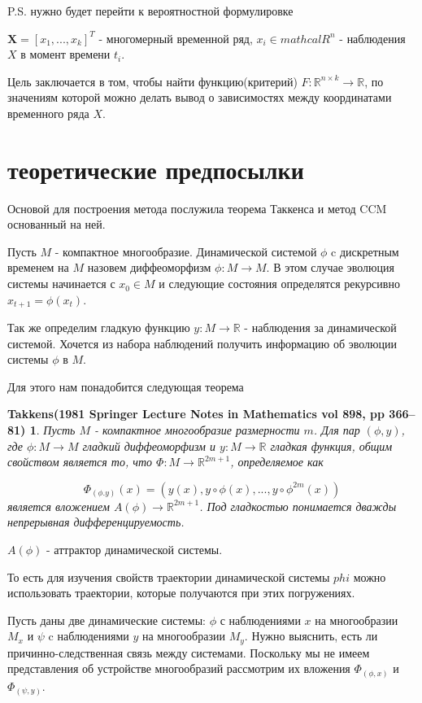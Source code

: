 \documentclass[12pt, twoside]{article}
\newtheorem{theorem}{Takkens(1981 Springer Lecture Notes in Mathematics vol 898, pp 366–81)}
\begin{document}
P.S. нужно будет перейти к вероятностной формулировке

$\mathbf{X} = [x_1, ... , x_k]^T$ - многомерный временной ряд, $x_i \in mathcal{R}^n$ - наблюдения $X$ в момент времени $t_i$.

Цель заключается в том, чтобы найти функцию(критерий) $F: \mathbb{R}^{n \times k } \rightarrow \mathbb R$, по значениям которой можно делать вывод о зависимостях между координатами временного ряда $X$.


\section{теоретические предпосылки}

Основой для построения метода послужила теорема Таккенса и метод CCM основанный на ней.

Пусть $M$ - компактное многообразие. Динамической системой $\phi$ c дискретным временем на $M$ назовем диффеоморфизм $\phi: M\rightarrow M$. В этом случае эволюция системы начинается с $x_0 \in M$ и следующие состояния определятся рекурсивно $x_{t+ 1} = \phi(x_t)$. 

Так же определим гладкую функцию $y: M \rightarrow \mathbb R$ - наблюдения за динамической системой. Хочется из набора наблюдений получить информацию об эволюции системы $\phi$ в $M$.

Для этого нам понадобится следующая теорема


\begin{theorem}
Пусть $M$ - компактное многообразие размерности $m$. Для пар $(\phi, y)$, где $\phi : M \rightarrow M$ гладкий диффеоморфизм и $y: M \rightarrow \mathbb R$ гладкая функция,
 общим свойством является то, что $\Phi: M \rightarrow \mathbb R^{2m + 1}$, определяемое как 

$$\Phi_{(\phi. y)} (x) = (y(x), y \circ \phi(x), ... , y \circ \phi^{2m}(x)) $$
является вложением $A(\phi) \rightarrow \mathbb R^{2m + 1}$. Под гладкостью понимается дважды непрерывная дифференцируемость.
\end{theorem}

$A(\phi)$ - аттрактор динамической системы.

То есть для изучения свойств траектории динамической системы $phi$ можно использовать траектории, которые получаются при этих погружениях.

Пусть даны две динамические системы: $\phi$ с наблюдениями $x$ на многообразии $M_x$ и $\psi$  c наблюдениями $y$ на многообразии $M_y$. 
Нужно выяснить, есть ли причинно-следственная связь между системами. Поскольку мы не имеем представления об устройстве многообразий рассмотрим их вложения $\Phi_(\phi, x)$ и $\Phi_(\psi, y)$.
\end{document}
